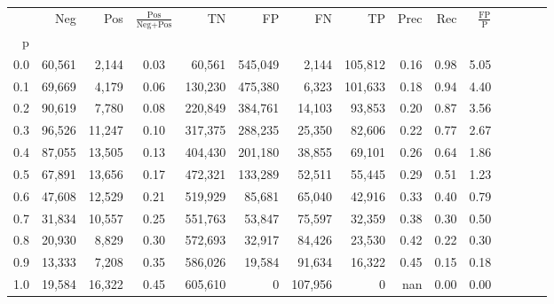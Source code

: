 \begin{tabular}{rrrcrrrrrrrrrrr}
\toprule
{} &     Neg &     Pos & $\frac{\text{Pos}}{\text{Neg}+\text{Pos}}$ &       TN &       FP &       FN &       TP &  Prec &   Rec & $\frac{\text{FP}}{\text{P}}$ \\
p   &         &         &                                            &          &          &          &          &       &       &                              \\
\midrule
0.0 &  60,561 &   2,144 &                                       0.03 &   60,561 &  545,049 &    2,144 &  105,812 &  0.16 &  0.98 &                         5.05 \\
0.1 &  69,669 &   4,179 &                                       0.06 &  130,230 &  475,380 &    6,323 &  101,633 &  0.18 &  0.94 &                         4.40 \\
0.2 &  90,619 &   7,780 &                                       0.08 &  220,849 &  384,761 &   14,103 &   93,853 &  0.20 &  0.87 &                         3.56 \\
0.3 &  96,526 &  11,247 &                                       0.10 &  317,375 &  288,235 &   25,350 &   82,606 &  0.22 &  0.77 &                         2.67 \\
0.4 &  87,055 &  13,505 &                                       0.13 &  404,430 &  201,180 &   38,855 &   69,101 &  0.26 &  0.64 &                         1.86 \\
0.5 &  67,891 &  13,656 &                                       0.17 &  472,321 &  133,289 &   52,511 &   55,445 &  0.29 &  0.51 &                         1.23 \\
0.6 &  47,608 &  12,529 &                                       0.21 &  519,929 &   85,681 &   65,040 &   42,916 &  0.33 &  0.40 &                         0.79 \\
0.7 &  31,834 &  10,557 &                                       0.25 &  551,763 &   53,847 &   75,597 &   32,359 &  0.38 &  0.30 &                         0.50 \\
0.8 &  20,930 &   8,829 &                                       0.30 &  572,693 &   32,917 &   84,426 &   23,530 &  0.42 &  0.22 &                         0.30 \\
0.9 &  13,333 &   7,208 &                                       0.35 &  586,026 &   19,584 &   91,634 &   16,322 &  0.45 &  0.15 &                         0.18 \\
1.0 &  19,584 &  16,322 &                                       0.45 &  605,610 &        0 &  107,956 &        0 &   nan &  0.00 &                         0.00 \\
\bottomrule
\end{tabular}

